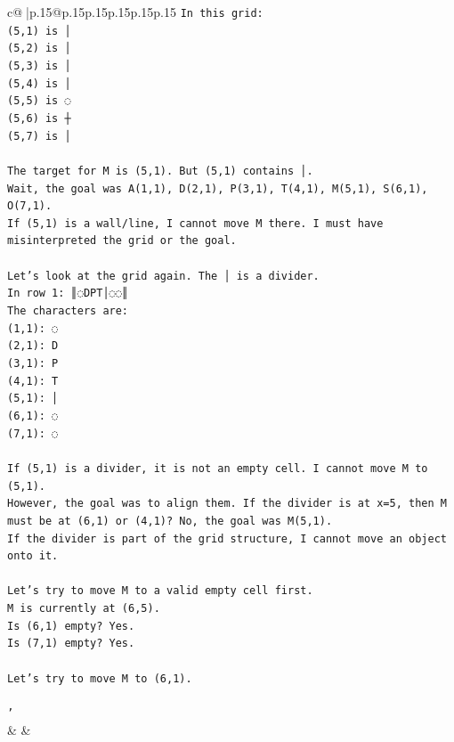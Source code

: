 \documentclass{article}
\begin{document}
{\begin{supertabular}{c@{$\;$}|p{.15\linewidth}@{}p{.15\linewidth}p{.15\linewidth}p{.15\linewidth}p{.15\linewidth}p{.15\linewidth}}
{{{\texttt{In this grid:} \\
\texttt{(5,1) is │} \\
\texttt{(5,2) is │} \\
\texttt{(5,3) is │} \\
\texttt{(5,4) is │} \\
\texttt{(5,5) is ◌} \\
\texttt{(5,6) is ┼} \\
\texttt{(5,7) is │} \\
\\ 
\texttt{The target for M is (5,1). But (5,1) contains │.} \\
\texttt{Wait, the goal was A(1,1), D(2,1), P(3,1), T(4,1), M(5,1), S(6,1), O(7,1).} \\
\texttt{If (5,1) is a wall/line, I cannot move M there. I must have misinterpreted the grid or the goal.} \\
\\ 
\texttt{Let's look at the grid again. The │ is a divider.} \\
\texttt{In row 1: ║◌DPT│◌◌║} \\
\texttt{The characters are:} \\
\texttt{(1,1): ◌} \\
\texttt{(2,1): D} \\
\texttt{(3,1): P} \\
\texttt{(4,1): T} \\
\texttt{(5,1): │} \\
\texttt{(6,1): ◌} \\
\texttt{(7,1): ◌} \\
\\ 
\texttt{If (5,1) is a divider, it is not an empty cell. I cannot move M to (5,1).} \\
\texttt{However, the goal was to align them. If the divider is at x=5, then M must be at (6,1) or (4,1)? No, the goal was M(5,1).} \\
\texttt{If the divider is part of the grid structure, I cannot move an object onto it.} \\
\\ 
\texttt{Let's try to move M to a valid empty cell first.} \\
\texttt{M is currently at (6,5).} \\
\texttt{Is (6,1) empty? Yes.} \\
\texttt{Is (7,1) empty? Yes.} \\
\\ 
\texttt{Let's try to move M to (6,1).} \\
\\ 
\texttt{'} \\
            }
        }
    }
    & & \\ \\


\end{supertabular}}
\end{document}
